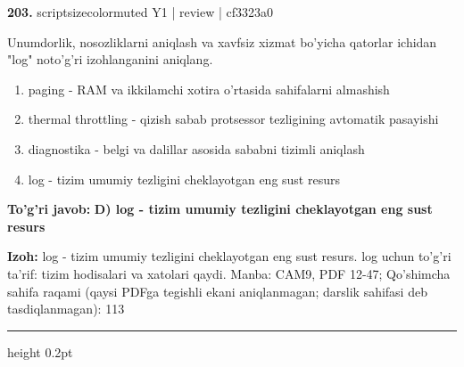 \documentclass[10pt,a4paper]{article}
\begin{document}
{\bfseries\sffamily\color{ink} 203.} {scriptsizecolor{muted} Y1 | review | cf3323a0}
\par
Unumdorlik, nosozliklarni aniqlash va xavfsiz xizmat bo'yicha qatorlar ichidan "log" noto'g'ri izohlanganini aniqlang.
\begin{enumerate}[label=\Alph*),leftmargin=9mm]
\item paging - RAM va ikkilamchi xotira o'rtasida sahifalarni almashish
\item thermal throttling - qizish sabab protsessor tezligining avtomatik pasayishi
\item diagnostika - belgi va dalillar asosida sababni tizimli aniqlash
\item log - tizim umumiy tezligini cheklayotgan eng sust resurs
\end{enumerate}
\begin{tcolorbox}[enhanced,breakable,colback=teal!4,colframe=teal!60!black,boxrule=0.45pt,arc=1.2mm,left=2.7mm,right=2.7mm,top=1.8mm,bottom=1.8mm,before skip=2mm,after skip=2mm]
{\bfseries\sffamily\color{teal}To'g'ri javob:} \textbf{D) log - tizim umumiy tezligini cheklayotgan eng sust resurs}
\par\smallskip
{\bfseries Izoh:} log - tizim umumiy tezligini cheklayotgan eng sust resurs. log uchun to'g'ri ta'rif: tizim hodisalari va xatolari qaydi. Manba: CAM9, PDF 12-47; Qo'shimcha sahifa raqami (qaysi PDFga tegishli ekani aniqlanmagan; darslik sahifasi deb tasdiqlanmagan): 113
\end{tcolorbox}
\vspace{2mm}\hrule height 0.2pt\vspace{3mm}
\end{document}
